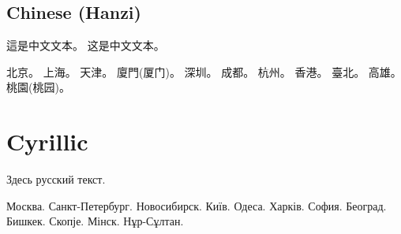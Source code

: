 \documentclass[a4paper]{ujarticle}
\begin{document}
\subsection{Chinese (Hanzi)}
\begin{otherlanguage}{tchinese}
這是中文文本。
\foreignlanguage{schinese}{这是中文文本。}

北京。
上海。
天津。
廈門\foreignlanguage{schinese}{(厦门)}。
深圳。
成都。
杭州。
香港。
臺北。
高雄。
桃園\foreignlanguage{schinese}{(桃园)}。
\end{otherlanguage}

\section{Cyrillic}
\selectfont
Здесь русский текст.

Москва.
Санкт-Петербург.
Новосибирск.
Київ.
Одеса.
Харків.
София.
Београд.
Бишкек.
Скопје.
Мінск.
Нұр-Сұлтан.

\selectfont

\printindex
\end{document}
